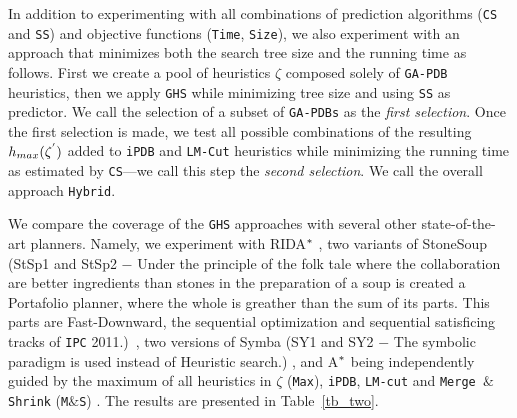 In addition to experimenting with all combinations of prediction algorithms (\texttt{CS} and \texttt{SS}) and objective functions (\texttt{Time}, \texttt{Size}), we also experiment with an approach that minimizes both the search tree size and the running time as follows. First we create a pool of heuristics $\zeta$ composed solely of \texttt{GA-PDB} heuristics, then we apply \texttt{GHS} while minimizing tree size and using \texttt{SS} as predictor. We call the selection of a subset of \texttt{GA-PDBs} as the \textit{first selection}. Once the first selection is made, we test all possible combinations of the resulting $h_{max}(\zeta\sp{'})$ added to \texttt{iPDB} and \texttt{LM-Cut} heuristics while minimizing the running time as estimated by \texttt{CS}---we call this step the \textit{second selection}. We call the overall approach \texttt{Hybrid}.


We compare the coverage of the \texttt{GHS} approaches with several other state-of-the-art planners. Namely, we experiment with RIDA$\sp{*}$ \cite{BarleySantiagoOver}, two variants of StoneSoup (StSp1 and StSp2 $-$ Under the principle of the folk tale where the collaboration are better ingredients than stones in the preparation of a soup is created a Portafolio planner, where the whole is greather than the sum of its parts. This parts are Fast-Downward, the sequential optimization and sequential satisficing tracks of \texttt{IPC} 2011.)~\cite{HelmertRK11}, two versions of Symba (SY1 and SY2 $-$ The symbolic paradigm is used instead of Heuristic search.) \cite{torralba2015phd}, and A$\sp{*}$ being independently guided by the maximum of all heuristics in $\zeta$ (\texttt{Max}), \texttt{iPDB}, \texttt{LM-cut} and \texttt{Merge $\&$ Shrink} (\texttt{M$\&$S}) \cite{nissim2011computing}. The results are presented in Table~\ref{tb_two}.


